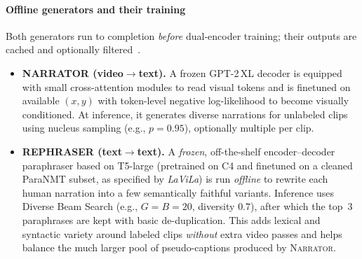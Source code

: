 \begin{enrichment}
\begin{enrichment}
        \paragraph{Offline generators and their training}
        Both generators run to completion \emph{before} dual\mbox{-}encoder training; their outputs are cached and optionally filtered~\cite{zhao2022_lavila}.
        \begin{itemize}
            \item \textbf{NARRATOR (video$\to$text).} A frozen GPT\mbox{-}2\,XL decoder is equipped with small cross\mbox{-}attention modules to read visual tokens and is finetuned on available $(x,y)$ with token\mbox{-}level negative log\mbox{-}likelihood to become visually conditioned. At inference, it generates diverse narrations for unlabeled clips using nucleus sampling (e.g., $p{=}0.95$), optionally multiple per clip.
            \item \textbf{REPHRASER (text$\to$text).} A \emph{frozen}, off-the-shelf encoder--decoder paraphraser based on T5-large (pretrained on C4 and finetuned on a cleaned ParaNMT subset, as specified by \emph{LaViLa}) is run \emph{offline} to rewrite each human narration into a few semantically faithful variants. Inference uses Diverse Beam Search (e.g., $G{=}B{=}20$, diversity $0.7$), after which the top~3 paraphrases are kept with basic de-duplication. This adds lexical and syntactic variety around labeled clips \emph{without} extra video passes and helps balance the much larger pool of pseudo-captions produced by \textsc{Narrator}.~\cite{zhao2022_lavila}
        \end{itemize}
        

\end{enrichment}
\end{enrichment}

